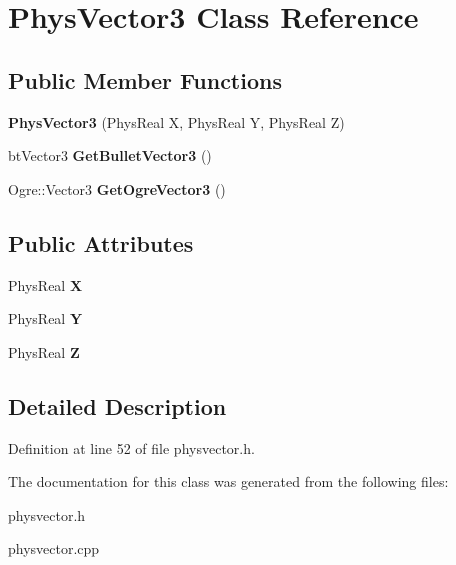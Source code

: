 \hypertarget{classPhysVector3}{
\section{PhysVector3 Class Reference}
\label{da/d11/classPhysVector3}
}
\subsection*{Public Member Functions}
\begin{DoxyCompactItemize}
\item 
\hypertarget{classPhysVector3_aad8161121a45b20dde0e3cc6959801be}{
{\bfseries PhysVector3} (PhysReal X, PhysReal Y, PhysReal Z)}
\label{da/d11/classPhysVector3_aad8161121a45b20dde0e3cc6959801be}

\item 
\hypertarget{classPhysVector3_adfc5f9e933a94be994ce5ce0c38d1f96}{
btVector3 {\bfseries GetBulletVector3} ()}
\label{da/d11/classPhysVector3_adfc5f9e933a94be994ce5ce0c38d1f96}

\item 
\hypertarget{classPhysVector3_a01facc2b865bb79c589ed1985dd6c49c}{
Ogre::Vector3 {\bfseries GetOgreVector3} ()}
\label{da/d11/classPhysVector3_a01facc2b865bb79c589ed1985dd6c49c}

\end{DoxyCompactItemize}
\subsection*{Public Attributes}
\begin{DoxyCompactItemize}
\item 
\hypertarget{classPhysVector3_ac4586254a6116c616046bd9d5b35ca31}{
PhysReal {\bfseries X}}
\label{da/d11/classPhysVector3_ac4586254a6116c616046bd9d5b35ca31}

\item 
\hypertarget{classPhysVector3_a9bf4609392a492c2b3e278d635ed976a}{
PhysReal {\bfseries Y}}
\label{da/d11/classPhysVector3_a9bf4609392a492c2b3e278d635ed976a}

\item 
\hypertarget{classPhysVector3_a0c0585976cb4c215626e205a2c663226}{
PhysReal {\bfseries Z}}
\label{da/d11/classPhysVector3_a0c0585976cb4c215626e205a2c663226}

\end{DoxyCompactItemize}


\subsection{Detailed Description}


Definition at line 52 of file physvector.h.

The documentation for this class was generated from the following files:\begin{DoxyCompactItemize}
\item 
physvector.h\item 
physvector.cpp\end{DoxyCompactItemize}
